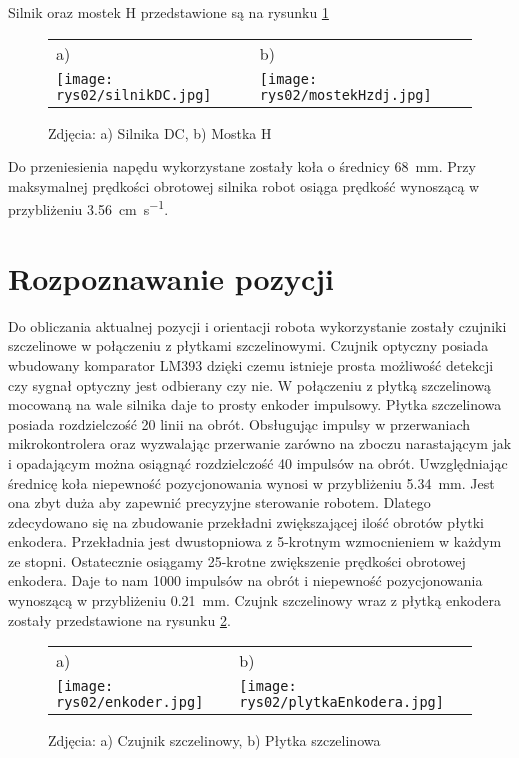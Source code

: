 		Silnik oraz mostek H przedstawione są na rysunku \ref{fig:silnikImostek}
		\begin{figure}[h]
			\centering
			\begin{tabular}{@{}ll@{}}
				a) & b) \\
				\texttt{[image: rys02/silnikDC.jpg]} & 
				\texttt{[image: rys02/mostekHzdj.jpg]} \\
			\end{tabular}
			\caption{Zdjęcia: a) Silnika DC, b) Mostka H}
			\label{fig:silnikImostek}
		\end{figure}
	
		Do przeniesienia napędu wykorzystane zostały koła o średnicy \SI{68}{\milli\meter}. Przy maksymalnej prędkości obrotowej silnika robot osiąga prędkość wynoszącą w przybliżeniu \SI[per-mode=symbol]{3.56}{\cm\per\second}.
		
	\section{Rozpoznawanie pozycji}
		Do obliczania aktualnej pozycji i orientacji robota wykorzystanie zostały czujniki szczelinowe w połączeniu z płytkami szczelinowymi. Czujnik optyczny posiada wbudowany komparator LM393 dzięki czemu istnieje prosta możliwość detekcji czy sygnał optyczny jest odbierany czy nie. W połączeniu z płytką szczelinową mocowaną na wale silnika daje to prosty enkoder impulsowy. Płytka szczelinowa posiada rozdzielczość 20 linii na obrót. Obsługując impulsy w przerwaniach mikrokontrolera oraz wyzwalając przerwanie zarówno na zboczu narastającym jak i opadającym można osiągnąć rozdzielczość 40 impulsów na obrót. Uwzględniając średnicę koła niepewność pozycjonowania wynosi w przybliżeniu \SI{5.34}{mm}. Jest ona zbyt duża aby zapewnić precyzyjne sterowanie robotem. Dlatego zdecydowano się na zbudowanie przekładni zwiększającej ilość obrotów płytki enkodera. Przekładnia jest dwustopniowa z 5-krotnym wzmocnieniem w każdym ze stopni. Ostatecznie osiągamy 25-krotne zwiększenie prędkości obrotowej enkodera. Daje to nam 1000 impulsów na obrót i niepewność pozycjonowania wynoszącą w przybliżeniu \SI{0.21}{\milli\meter}. Czujnk szczelinowy wraz z płytką enkodera zostały przedstawione na rysunku \ref{fig:enkoderZplytka}.
		
		\begin{figure}[h]
			\centering
			\begin{tabular}{@{}ll@{}}
				a) & b) \\
				\texttt{[image: rys02/enkoder.jpg]} & 
				\texttt{[image: rys02/plytkaEnkodera.jpg]} \\
			\end{tabular}
			\caption{Zdjęcia: a) Czujnik szczelinowy, b) Płytka szczelinowa}
			\label{fig:enkoderZplytka}
		\end{figure}
	
